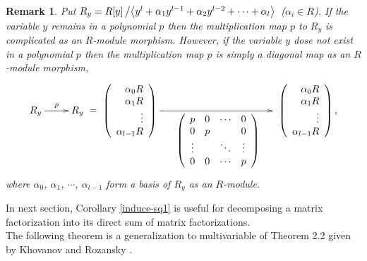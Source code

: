 \documentclass[10pt]{amsart}
\theoremstyle{break}
\newtheorem{rem}[de]{Remark}
\begin{document}
\begin{rem}
Put $R_y=R[y]\left/\left<y^l+\alpha_1y^{l-1} +\alpha_2y^{l-2} +\cdots +\alpha_l\right>\right.$ ($\alpha_i\in R$). If the variable $y$ remains in a polynomial $p$ then the multiplication map $p$ to $R_y$ is complicated as an $R$-module morphism. However, if the variable $y$ dose not exist in a polynomial $p$ then the multiplication map $p$ is simply a diagonal map as an $R$-module morphism,
\begin{equation*}
\xymatrix{
R_y\ar[r]^{p}&R_y
}
=
\xymatrix{
\hbox{$
\left(
\begin{array}{r}
\alpha_0 R\\
\alpha_1 R\\
\vdots\\
\alpha_{l-1} R
\end{array}
\right)
$}
\ar[rrrr]_{
\hbox{$
\left(
\begin{array}{cccc}
p&0&\cdots&0\\
0&p&&0\\
\vdots&&\ddots&\vdots\\
0&0&\cdots&p
\end{array}
\right)
$}
}&&&&
\hbox{
$\left(
\begin{array}{r}
\alpha_0 R\\
\alpha_1 R\\
\vdots\\
\alpha_{l-1} R
\end{array}
\right),
$}
}
\end{equation*}
where $\alpha_0$, $\alpha_1$, $\cdots$, $\alpha_{l-1}$ form a basis of $R_y$ as an $R$-module.
\end{rem}
In next section, Corollary \ref{induce-sq1} is useful for decomposing a matrix factorization into its direct sum of matrix factorizations.\\

\indent The following theorem is a generalization to multivariable of Theorem 2.2 given by Khovanov and Rozansky \cite{KR3}\cite{Yone1}.
\end{document}
